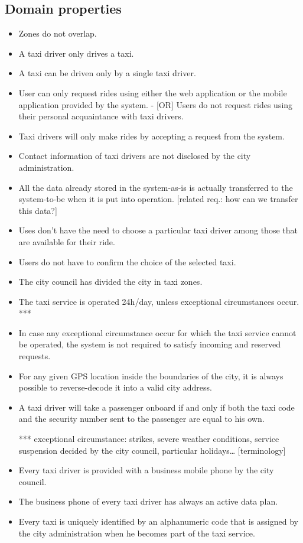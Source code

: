 \subsection{Domain properties}
\begin{itemize}
\item Zones do not overlap.
\item A taxi driver only drives a taxi.
\item A taxi can be driven only by a single taxi driver.
\item User can only request rides using either the web application or the mobile application provided by the system.
- [OR] Users do not request rides using their personal acquaintance with taxi drivers.
\item Taxi drivers will only make rides by accepting a request from the system.
\item Contact information of taxi drivers are not disclosed by the city administration.
\item All the data already stored in the system-as-is is actually transferred to the system-to-be when it is put into operation. [related req.: how can we transfer this data?]
\item Uses don't have the need to choose a particular taxi driver among those that are available for their ride.
\item Users do not have to confirm the choice of the selected taxi.
\item The city council has divided the city in taxi zones.
\item The taxi service is operated 24h/day, unless exceptional circumstances occur. ***
\item In case any exceptional circumstance occur for which the taxi service cannot be operated, the system is not required to satisfy incoming and reserved requests. 
\item For any given GPS location inside the boundaries of the city, it is always possible to reverse-decode it into a valid city address. 
\item A taxi driver will take a passenger onboard if and only if both the taxi code and the security number sent to the passenger are equal to his own. 

*** exceptional circumstance: strikes, severe weather conditions, service suspension decided by the city council, particular holidays… [terminology]
\item Every taxi driver is provided with a business mobile phone by the city council.
\item The business phone of every taxi driver has always an active data plan.
\item Every taxi is uniquely identified by an alphanumeric code that is assigned by the city administration when he becomes part of the taxi service.
\end{itemize}

